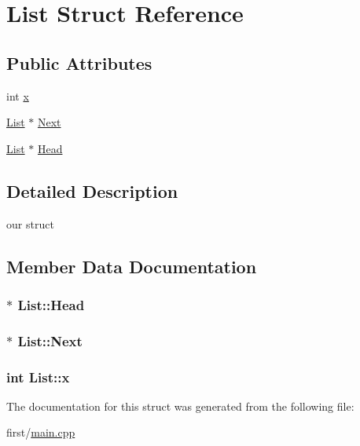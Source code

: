\hypertarget{struct_list}{\section{List Struct Reference}
\label{struct_list}
}
\subsection*{Public Attributes}
\begin{DoxyCompactItemize}
\item 
int \hyperlink{struct_list_a434f11cf7bdbc103eabff5c2c9046466}{x}
\item 
\hyperlink{struct_list}{List} $\ast$ \hyperlink{struct_list_aa7b2314955fa16d18bc5d37f24f1533a}{Next}
\item 
\hyperlink{struct_list}{List} $\ast$ \hyperlink{struct_list_ab85609a0a468113915e2ec8d050943bf}{Head}
\end{DoxyCompactItemize}


\subsection{Detailed Description}
our struct 

\subsection{Member Data Documentation}
\hypertarget{struct_list_ab85609a0a468113915e2ec8d050943bf}{
\subsubsection[{Head}]{ $\ast$ List\-::\-Head}}\label{struct_list_ab85609a0a468113915e2ec8d050943bf}
\hypertarget{struct_list_aa7b2314955fa16d18bc5d37f24f1533a}{
\subsubsection[{Next}]{$\ast$ List\-::\-Next}}\label{struct_list_aa7b2314955fa16d18bc5d37f24f1533a}
\hypertarget{struct_list_a434f11cf7bdbc103eabff5c2c9046466}{
\subsubsection[{x}]{\setlength{\rightskip}{0pt plus 5cm}int List\-::x}}\label{struct_list_a434f11cf7bdbc103eabff5c2c9046466}


The documentation for this struct was generated from the following file\-:\begin{DoxyCompactItemize}
\item 
first/\hyperlink{main_8cpp}{main.\-cpp}\end{DoxyCompactItemize}
